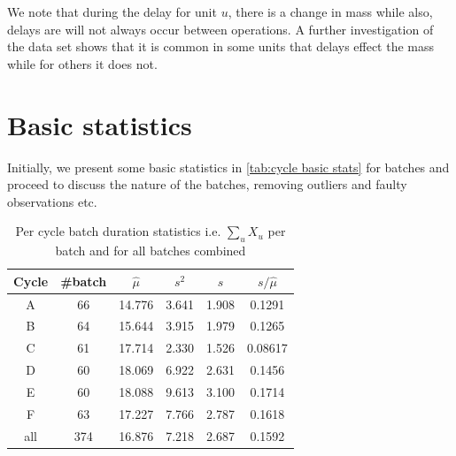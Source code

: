 \documentclass[../Thesis.tex]{subfiles}
\begin{document}

We note that during the delay for unit $u$, there is a change in mass while also, delays are will not always occur between operations. A further investigation of the data set shows that it is common in some units that delays effect the mass while for others it does not. 



\section{Basic statistics}
Initially, we present some basic statistics in \autoref{tab:cycle basic stats} for batches and proceed to discuss the nature of the batches, removing outliers and faulty observations etc.



\begin{table}[h]
    \centering
    \begin{tabular}{c|c|c|c|c|c}
        Cycle & \#batch & $\hat{\mu}$  & $s^2$ & $s$ & $s / \hat{\mu}$ \\ \hline
        A     & 66      & 14.776 & 3.641      & 1.908    & 0.1291         \\
        B     & 64      & 15.644 & 3.915      & 1.979    & 0.1265         \\
        C     & 61      & 17.714 & 2.330      & 1.526    & 0.08617        \\
        D     & 60      & 18.069 & 6.922      & 2.631    & 0.1456         \\
        E     & 60      & 18.088 & 9.613      & 3.100    & 0.1714         \\
        F     & 63      & 17.227 & 7.766      & 2.787    & 0.1618         \\\hline
        all   & 374     & 16.876 & 7.218      & 2.687    & 0.1592
    \end{tabular}
    \caption{Per cycle batch duration statistics i.e. $\sum_u X_u$ per batch and for all batches combined}
    \label{tab:cycle basic stats}
\end{table}
\end{document}
